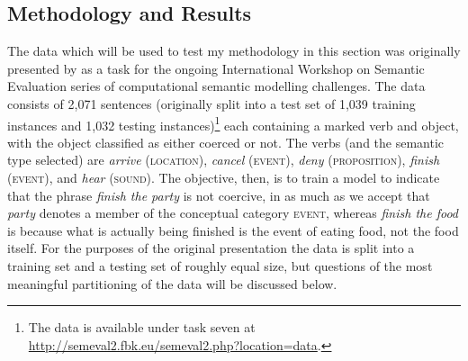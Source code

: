 \subsection{Methodology and Results}
The data which will be used to test my methodology in this section was originally presented by \cite{PustejovskyEA2010} as a task for the ongoing International Workshop on Semantic Evaluation series of computational semantic modelling challenges.  The data consists of 2,071 sentences (originally split into a test set of 1,039 training instances and 1,032 testing instances)\footnote{The data is available under task seven at \url{http://semeval2.fbk.eu/semeval2.php?location=data}.} each containing a marked verb and object, with the object classified as either coerced or not.     The verbs (and the semantic type selected) are \emph{arrive} (\textsc{location}), \emph{cancel} (\textsc{event}), \emph{deny} (\textsc{proposition}), \emph{finish} (\textsc{event}), and \emph{hear} (\textsc{sound}).  The objective, then, is to train a model to indicate that the phrase \emph{finish the party} is not coercive, in as much as we accept that \emph{party} denotes a member of the conceptual category \textsc{event}, whereas \emph{finish the food} is because what is actually being finished is the event of eating food, not the food itself.  For the purposes of the original presentation the data is split into a training set and a testing set of roughly equal size, but questions of the most meaningful partitioning of the data will be discussed below.


